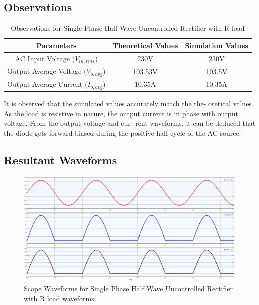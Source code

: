 \subsection{Observations}

\begin{table}[h]
    \renewcommand{\arraystretch}{1.3}
    \caption{Observations for Single Phase Half Wave Uncontrolled Rectifier with R load}
    \label{table_observation_circuit_1}
    \centering
    \begin{tabular}{|c|c|c|}
        \hline
        Parameters                              & Theoretical Values & Simulation Values \\
        \hline
        \hline
        AC Input Voltage ($ V_{in,rms} $)       & 230V               & 230V              \\
        \hline
        Output Average Voltage ($ V_{o,avg} $)  & 103.53V            & 103.5V            \\
        \hline
        Output Average Current ($ I_{o,avg}  $) & 10.35A             & 10.35A            \\
        \hline
    \end{tabular}
\end{table}


It is observed that the simulated values accurately match the the-
oretical values. As the load is resistive in nature, the output current
is in phase with output voltage. From the output voltage and cur-
rent waveforms, it can be deduced that the diode gets forward biased
during the positive half cycle of the AC source.

\pagebreak

\subsection{Resultant Waveforms}

\begin{figure}[h]
    \centering
    \includegraphics[width=1\textwidth]{images/experiment-1/circuit-scope-simulation-01.png}
    \caption{Scope Waveforms for Single Phase Half Wave Uncontrolled Rectifier with R load waveforms}
    \label{Fig_waveform_single-phase-half-wave-uncontrolled-rectifier-with-R-load}
\end{figure}

\pagebreak